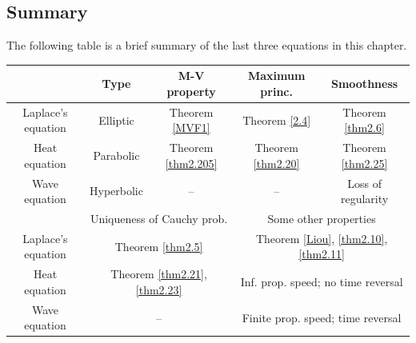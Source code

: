 \documentclass[hyperref,UTF8,12pt]{article}
\numberwithin{equation}{subsection}
\theoremstyle{plain}
\theoremstyle{definition}
\numberwithin{theorem}{section}
\numberwithin{lemma}{section}
\numberwithin{proposition}{section}
\numberwithin{remark}{section}
\numberwithin{corollary}{section}
\numberwithin{definition}{section}
\numberwithin{problem}{section}
\numberwithin{example}{section}
\begin{document}
\newpage
\subsection{Summary}
The following table is a brief summary of the last three equations in this chapter.
\begin{table}[h]
	\centering
	\begin{tabular}{|c|c|c|c|c|}
		\hline
		& \multicolumn{1}{c|}{Type} & M-V property & \multicolumn{1}{c|}{Maximum princ.} & Smoothness \\ \hline
		Laplace's equation & \multicolumn{1}{c|}{Elliptic} & Theorem \ref{MVF1} & \multicolumn{1}{c|}{Theorem \ref{2.4}} & Theorem \ref{thm2.6} \\ \hline
		Heat equation & \multicolumn{1}{c|}{Parabolic} & Theorem \ref{thm2.205} & \multicolumn{1}{c|}{Theorem \ref{thm2.20}} & Theorem \ref{thm2.25} \\ \hline
		Wave equation & \multicolumn{1}{c|}{Hyperbolic} & -- & \multicolumn{1}{c|}{--} & {\color{red} Loss of regularity} \\ \hline\hline
		\multicolumn{1}{|l|}{} & \multicolumn{2}{c|}{Uniqueness of Cauchy prob.} & \multicolumn{2}{c|}{Some other properties} \\ \hline
		Laplace's equation & \multicolumn{2}{c|}{Theorem \ref{thm2.5}} & \multicolumn{2}{c|}{Theorem \ref{Liou}, \ref{thm2.10}, \ref{thm2.11}} \\ \hline
		Heat equation & \multicolumn{2}{c|}{Theorem \ref{thm2.21}, \ref{thm2.23}} & \multicolumn{2}{c|}{Inf. prop. speed; no time reversal} \\ \hline
		Wave equation & \multicolumn{2}{c|}{--} & \multicolumn{2}{c|}{Finite prop. speed; time reversal} \\ \hline
	\end{tabular}
\end{table}


\newpage
\end{document}
